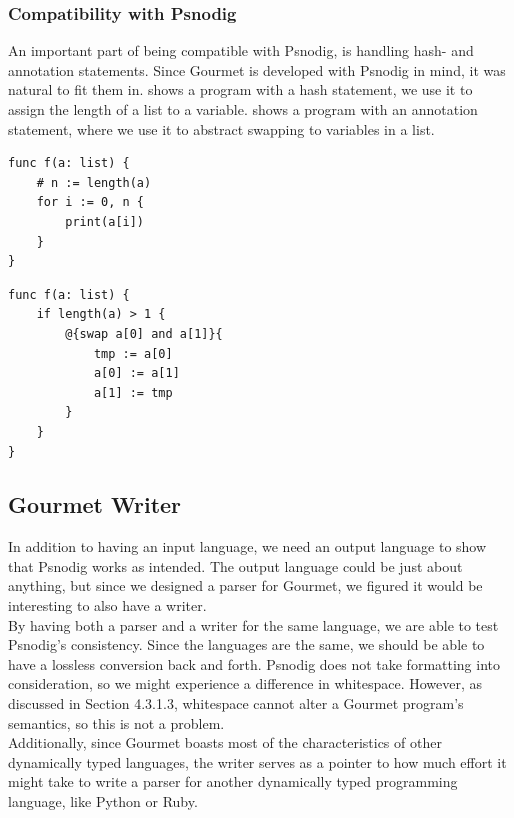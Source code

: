 \subsubsection{Compatibility with Psnodig}

An important part of being compatible with Psnodig, is handling hash- and annotation statements. Since Gourmet is developed with Psnodig in mind, it was natural to fit them in.  shows a program with a hash statement, we use it to assign the length of a list to a variable.  shows a program with an annotation statement, where we use it to abstract swapping to variables in a list. \\

\begin{lstlisting}[caption={A Gourmet program with a hash statement}, captionpos=b, label={hashStmtInAction}]
func f(a: list) {
    # n := length(a)
    for i := 0, n {
        print(a[i])
    }
}
\end{lstlisting}

\begin{lstlisting}[caption={A Gourmet program with an annotation statement}, captionpos=b, label={antStmtInAction}]
func f(a: list) {
    if length(a) > 1 {
        @{swap a[0] and a[1]}{
            tmp := a[0]
            a[0] := a[1]
            a[1] := tmp
        }
    }
}
\end{lstlisting}

\subsection{Gourmet Writer}

In addition to having an input language, we need an output language to show that Psnodig works as intended. The output language could be just about anything, but since we designed a parser for Gourmet, we figured it would be interesting to also have a writer. \\

By having both a parser and a writer for the same language, we are able to test Psnodig's consistency. Since the languages are the same, we should be able to have a lossless conversion back and forth. Psnodig does not take formatting into consideration, so we might experience a difference in whitespace. However, as discussed in Section 4.3.1.3, whitespace cannot alter a Gourmet program's semantics, so this is not a problem. \\

Additionally, since Gourmet boasts most of the characteristics of other dynamically typed languages, the writer serves as a pointer to how much effort it might take to write a parser for another dynamically typed programming language, like Python or Ruby.

